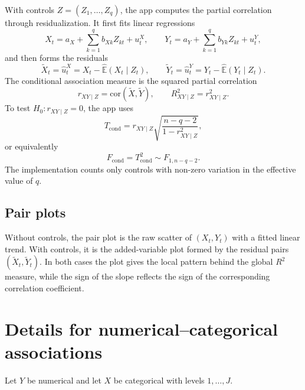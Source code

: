 \documentclass[11pt]{article}
\begin{document}
\begin{appendix}
With controls $Z = (Z_1, \dots, Z_q)$, the app computes the partial
correlation through residualization. It first fits linear regressions
\begin{equation}
X_t = a_X + \sum_{k=1}^{q} b_{Xk} Z_{kt} + u^X_t,
\qquad
Y_t = a_Y + \sum_{k=1}^{q} b_{Yk} Z_{kt} + u^Y_t,
\label{eq:app-resid-models}
\end{equation}
and then forms the residuals
\begin{equation}
\tilde{X}_t = \hat{u}^X_t = X_t - \widehat{\mathbb{E}}(X_t \mid Z_t),
\qquad
\tilde{Y}_t = \hat{u}^Y_t = Y_t - \widehat{\mathbb{E}}(Y_t \mid Z_t).
\label{eq:app-resids}
\end{equation}
The conditional association measure is the squared partial correlation
\begin{equation}
r_{XY\mid Z} = \mathrm{cor}(\tilde{X}, \tilde{Y}),
\qquad
R^2_{XY\mid Z} = r_{XY\mid Z}^2.
\label{eq:app-partial-r}
\end{equation}
To test $H_0: r_{XY\mid Z} = 0$, the app uses
\begin{equation}
T_{\mathrm{cond}}
=
r_{XY\mid Z}\sqrt{\frac{n-q-2}{1-r_{XY\mid Z}^2}},
\label{eq:app-t-partial}
\end{equation}
or equivalently
\begin{equation}
F_{\mathrm{cond}} = T_{\mathrm{cond}}^2 \sim F_{1,n-q-2}.
\label{eq:app-f-partial}
\end{equation}
The implementation counts only controls with non-zero variation in the
effective value of $q$.

\subsection{Pair plots}

Without controls, the pair plot is the raw scatter of $(X_t, Y_t)$ with a
fitted linear trend. With controls, it is the added-variable plot formed by
the residual pairs $(\tilde{X}_t, \tilde{Y}_t)$. In both cases the plot gives
the local pattern behind the global $R^2$ measure, while the sign of the slope
reflects the sign of the corresponding correlation coefficient.

\section{Details for numerical--categorical associations}
\label{app:numcat}

Let $Y$ be numerical and let $X$ be categorical with levels
$1, \dots, J$.


\end{appendix}
\end{document}

